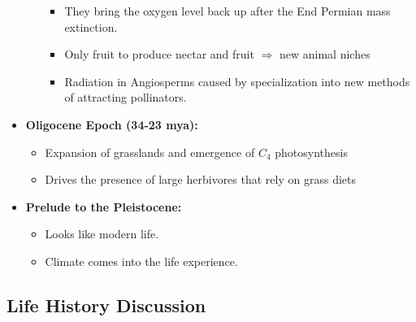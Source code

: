 \documentclass[12pt]{article}
\begin{document}
\begin{itemize}
\begin{itemize}
\begin{itemize}
            \item They bring the oxygen level back up after the End Permian mass extinction.
            \item Only fruit to produce nectar and fruit $\Rightarrow$ new animal niches
            \item Radiation in Angiosperms caused by specialization into new methods of attracting pollinators.
        \end{itemize}
    \end{itemize}
    \item \textbf{Oligocene Epoch (34-23 mya):}
    \begin{itemize}
        \item Expansion of grasslands and emergence of $C_4$ photosynthesis
        \item Drives the presence of large herbivores that rely on grass diets
    \end{itemize}
    \item \textbf{Prelude to the Pleistocene:}
    \begin{itemize}
        \item Looks like modern life.
        \item Climate comes into the life experience.
    \end{itemize}
\end{itemize}

\subsection{Life History Discussion}
\end{document}
